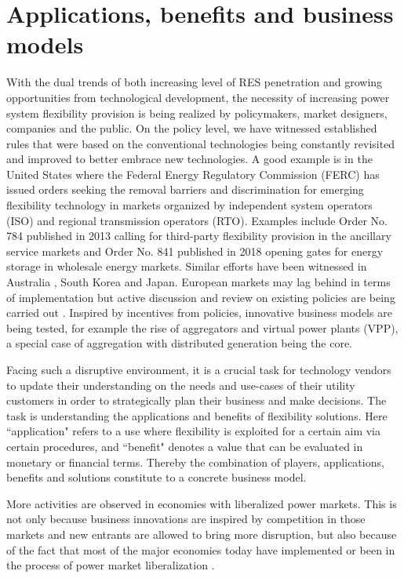 \section{Applications, benefits and business models}
With the dual trends of both increasing level of RES penetration and growing opportunities from technological development, the necessity of increasing power system flexibility provision is being realized by policymakers, market designers, companies and the public. On the policy level, we have witnessed established rules that were based on the conventional technologies being constantly revisited and improved to better embrace new technologies. A good example is in the United States where the Federal Energy Regulatory Commission (FERC) has issued orders seeking the removal barriers and discrimination for emerging flexibility technology in markets organized by independent system operators (ISO) and regional transmission operators (RTO). Examples include Order No. 784 \cite{FERC784} published in 2013 calling for third-party flexibility provision in the ancillary service markets and Order No. 841 \cite{FERC841} published in 2018 opening gates for energy storage in wholesale energy markets. Similar efforts have been witnessed in Australia \cite{Brown2015,AEMO_DR}, South Korea and Japan\cite{Lipari2017}. European markets may lag behind in terms of implementation but active discussion and review on existing policies are being carried out \cite{ENTSO-E2015,EuropeanCommission2017,Poganietz2017}. Inspired by incentives from policies, innovative business models are being tested, for example the rise of aggregators and virtual power plants (VPP), a special case of aggregation with distributed generation being the core. 

Facing such a disruptive environment, it is a crucial task for technology vendors to update their understanding on the needs and use-cases of their utility customers in order to strategically plan their business and make decisions. The task is understanding the applications and benefits of flexibility solutions.  Here ``application" refers to a use where flexibility is exploited for a certain aim via certain procedures, and ``benefit" denotes a value that can be evaluated in monetary or financial terms. Thereby the combination of players, applications, benefits and solutions constitute to a concrete business model.

More activities are observed in economies with liberalized power markets. This is not only because business innovations are inspired by competition in those markets and new entrants are allowed to bring more disruption, but also because of the fact that most of the major economies today have implemented or been in the process of power market liberalization \cite{Ranci2013,Vagliasindi2013}.

